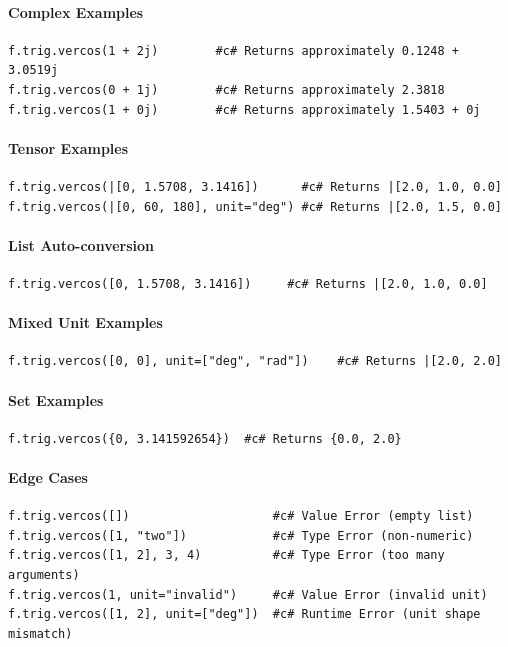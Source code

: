 \paragraph{Complex Examples}
\begin{verbatim}
f.trig.vercos(1 + 2j)        #c# Returns approximately 0.1248 + 3.0519j
f.trig.vercos(0 + 1j)        #c# Returns approximately 2.3818
f.trig.vercos(1 + 0j)        #c# Returns approximately 1.5403 + 0j
\end{verbatim}

\paragraph{Tensor Examples}
\begin{verbatim}
f.trig.vercos(|[0, 1.5708, 3.1416])      #c# Returns |[2.0, 1.0, 0.0]
f.trig.vercos(|[0, 60, 180], unit="deg") #c# Returns |[2.0, 1.5, 0.0]
\end{verbatim}

\paragraph{List Auto-conversion}
\begin{verbatim}
f.trig.vercos([0, 1.5708, 3.1416])     #c# Returns |[2.0, 1.0, 0.0]
\end{verbatim}

\paragraph{Mixed Unit Examples}
\begin{verbatim}
f.trig.vercos([0, 0], unit=["deg", "rad"])    #c# Returns |[2.0, 2.0]
\end{verbatim}

\paragraph{Set Examples}
\begin{verbatim}
f.trig.vercos({0, 3.141592654})  #c# Returns {0.0, 2.0}
\end{verbatim}

\paragraph{Edge Cases}
\begin{verbatim}
f.trig.vercos([])                    #c# Value Error (empty list)
f.trig.vercos([1, "two"])            #c# Type Error (non-numeric)
f.trig.vercos([1, 2], 3, 4)          #c# Type Error (too many arguments)
f.trig.vercos(1, unit="invalid")     #c# Value Error (invalid unit)
f.trig.vercos([1, 2], unit=["deg"])  #c# Runtime Error (unit shape mismatch)
\end{verbatim}


